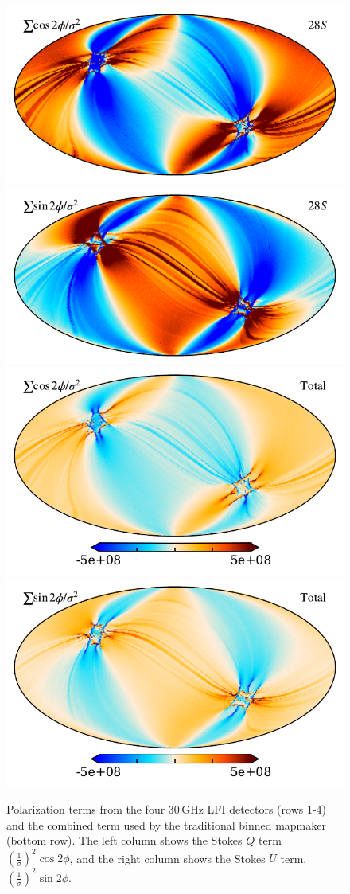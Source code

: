 \documentclass{aa}
\begin{document}
\begin{figure}[t]
  \includegraphics[width=0.47\linewidth]{figs/map_Q_polang28S.pdf}
  \includegraphics[width=0.47\linewidth]{figs/map_U_polang28S.pdf}\\
  \includegraphics[width=0.47\linewidth]{figs/map_Q_polang_all.pdf}
  \includegraphics[width=0.47\linewidth]{figs/map_U_polang_all.pdf}\\
  \caption{Polarization terms from the four 30\,GHz LFI detectors (rows 1-4) and the combined term used by the traditional binned mapmaker (bottom row). The left column shows the Stokes $Q$ term $(\frac{1}{\sigma})^2 \cos2\phi$, and the right column shows the Stokes $U$ term, $(\frac{1}{\sigma})^2 \sin2\phi$.}
  \label{fig:polangles}
\end{figure}



\end{document}
